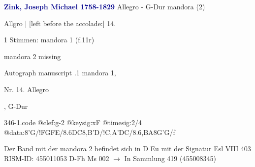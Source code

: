 \documentclass[twocolumn]{book}
\begin{document}
\newline \par \vspace{7pt} \textcolor{darkblue}{\textbf{Zink, Joseph Michael  1758-1829}}
\newline Allegro - G-Dur
\newline mandora (2)
\newline \begin{itshape}[f.11r, at left:] Allgro | [left before the accolade:] 14.\end{itshape} 
\newline \textcolor{darkblue}{}  1 Stimmen: mandora 1  (f.11r)
\newline \begin{small} mandora 2 missing\end{small} 
\newline Autograph manuscript
.1  mandora 1, \begin{itshape}Nr. 14. Allegro\end{itshape}, G-Dur  
\begin{filecontents*}{346-1.code}
@clef:g-2
@keysig:xF
@timesig:2/4
@data:8'G/!FGFE/{8.6DC}8,B'D/!{C,A}'DC/{8.6,BA}8G'G/f
\end{filecontents*}
\newline
%
\newline Der Band mit der mandora 2 befindet sich in D Eu mit der Signatur Esl VIII 403
\newline RISM-ID: 455011053
\newline D-Fh  Ms 002
\newline $\rightarrow$ In Sammlung 419 (455008345)
      
\end{document}
